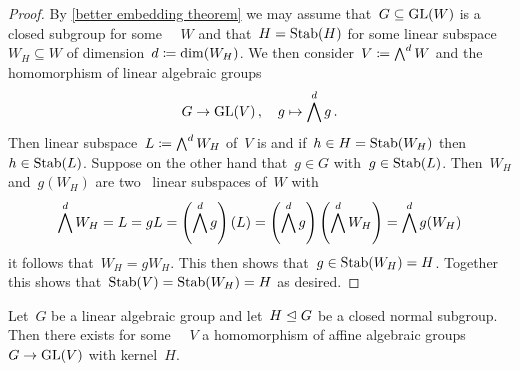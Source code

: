 \begin{proof}
  By \cref{better embedding theorem} we may assume that~$G \subseteq \operatorname{GL}(W)$ is a closed subgroup for some {\fd}~{\kvs}~$W$ and that~$H = \operatorname{Stab}(H)$ for some linear subspace~$W_H \subseteq W$ of dimension~$d \coloneqq \dim(W_H)$.
  We then consider~$V \coloneqq \bigwedge^d W$ and the homomorphism of linear algebraic groups
  \[
            G
    \to     \operatorname{GL}(V) \,,
    \quad   g
    \mapsto \bigwedge^d g \,.
  \]
  Then linear subspace~$L \coloneqq \bigwedge^d W_H$ of~$V$ is  and if~$h \in H =  \operatorname{Stab}(W_H)$ then~$h \in \operatorname{Stab}(L)$.
  Suppose on the other hand that~$g \in G$ with~$g \in \operatorname{Stab}(L)$.
  Then~$W_H$ and~$g(W_H)$ are two~ linear subspaces of~$W$ with
  \[
      \bigwedge^d W_H
    = L
    = g L
    = \left( \bigwedge^d g \right)(L)
    = \left( \bigwedge^d g \right) \left( \bigwedge^d W_H \right)
   =  \bigwedge^d g(W_H)
  \]
  it follows that~$W_H = g W_H$.
  This then shows that~$g \in \operatorname{Stab}(W_H) = H$.
  Together this shows that~$\operatorname{Stab}(V) = \operatorname{Stab}(W_H) = H$ as desired.
\end{proof}


\begin{proposition}
  Let~$G$ be a linear algebraic group and let~$H \trianglelefteq G$ be a closed normal subgroup.
  Then there exists for some {\fd}~{\kvs}~$V$ a homomorphism of affine algebraic groups~$G \to \operatorname{GL}(V)$ with kernel~$H$.
\end{proposition}


